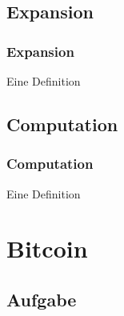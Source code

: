 \documentclass{beamer}
\begin{document}
\subsection{Expansion}
  \begin{frame} %
    \frametitle{Expansion} %
    \begin{Definition} %
      Eine Definition
    \end{Definition}
  \end{frame}
\subsection{Computation}
  \begin{frame} %
    \frametitle{Computation} %
    \begin{Definition} %
      Eine Definition
    \end{Definition}
  \end{frame}

\section{Bitcoin}
\subsection{Aufgabe}
\end{document}

